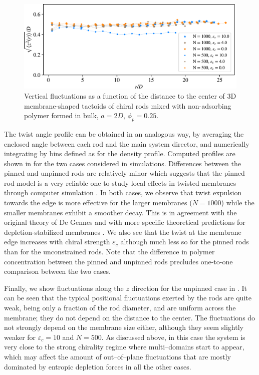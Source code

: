 \begin{figure}
\begin{center}
\includegraphics[width= .8\columnwidth]{figures/chapter-5/zstd}
	\caption[Vertical fluctuations]{Vertical fluctuations as a function of the distance to the center of 3D membrane-shaped tactoids of chiral rods mixed with non-adsorbing polymer formed in bulk, $a = 2D$, $\phi_p=0.25$. }
 \label{zstd}
\end{center}
\end{figure}

The twist angle profile can be obtained in an analogous way, by averaging the enclosed angle between each rod and the main system director, and numerically integrating by bins defined as for the density profile. Computed profiles are shown in  for the two cases considered in simulations. Differences between the pinned and unpinned rods are relatively minor which suggests that the pinned rod model is a very reliable one to study local effects in twisted membranes through computer simulation \cite{kuhnhold2022colloidal}. In both cases, we observe that twist expulsion towards the edge is more effective for the larger membranes ($N=1000$) while the smaller membranes exhibit a smoother decay. This is in agreement with the original theory of De Gennes \cite{gennes-prost} and with more specific theoretical predictions for depletion-stabilized membranes \cite{wensink2018elastic,kang_sm2016}. We also see that the twist at the membrane edge increases with chiral strength $\varepsilon_{c}$ although much less so for the pinned rods than for the unconstrained rods. Note that the difference in polymer concentration between the pinned and unpinned rods precludes one-to-one comparison between the two cases. 



Finally, we show fluctuations along the $z$ direction for the unpinned case in . It can be seen that the typical positional fluctuations exerted by the rods are quite weak, being only a fraction of the rod diameter,  and are uniform across the membrane; they do not depend on the distance to the center. The fluctuations do not strongly depend on the membrane size either, although they seem slightly weaker for $\varepsilon_c=10$ and $N=500$. As discussed above, in this case the system is very close to the strong chirality regime where multi--domains start to appear, which may affect the amount of out--of--plane fluctuations that are mostly dominated by entropic depletion forces in all the other cases.





